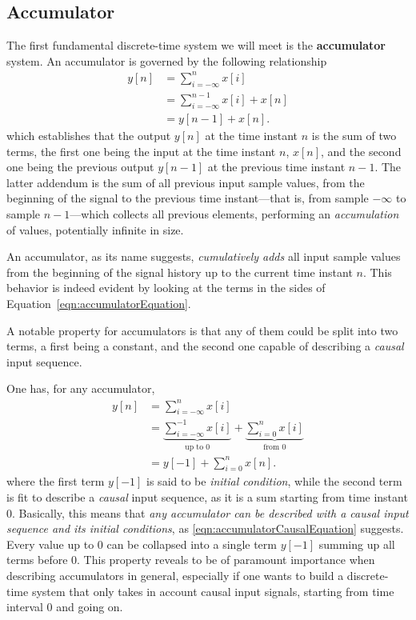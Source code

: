 \documentclass[\documentfontsize, twocolumn]{\classname}
\begin{document}
\subsection{Accumulator}

The first fundamental discrete-time system we will meet is the \textbf{accumulator} system. An accumulator is governed by the following relationship
\begin{align}
    y[n] &= \sum_{i=-\infty}^{n} x[i] \\
         &= \sum_{i=-\infty}^{n-1} x[i] + x[n]\\
         &= y[n-1] + x[n].\label{eqn:accumulatorEquation}
\end{align}
which establishes that the output $y[n]$ at the time instant $n$ is the sum of two terms, the first one being the input at the time instant $n$, $x[n]$, and the second one being the previous output $y[n-1]$ at the previous time instant $n-1$. The latter addendum is the sum of all previous input sample values, from the beginning of the signal to the previous time instant---that is, from sample $-\infty$ to sample $n-1$---which collects all previous elements, performing an \emph{accumulation} of values, potentially infinite in size.

An accumulator, as its name suggests, \emph{cumulatively adds} all input sample values from the beginning of the signal history up to the current time instant $n$. This behavior is indeed evident by looking at the terms in the sides of Equation~\ref{eqn:accumulatorEquation}.

A notable property for accumulators is that any of them could be split into two terms, a first being a constant, and the second one capable of describing a \emph{causal} input sequence.

One has, for any accumulator,
\begin{align}
    y[n] &= \sum_{i=-\infty}^{n} x[i] \\
         &= \underbrace{\sum_{i=-\infty}^{-1} x[i]}_{\mbox{up to } 0} + \underbrace{\sum_{i=0}^{n}x[i]}_{\mbox{from } 0}\\
         &= y[-1] + \sum_{i=0}^n x[n].\label{eqn:accumulatorCausalEquation}
\end{align}
where the first term $y[-1]$ is said to be \emph{initial condition}, while the second term is fit to describe a \emph{causal} input sequence, as it is a sum starting from time instant $0$. Basically, this means that \emph{any accumulator can be described with a causal input sequence and its initial conditions}, as \ref{eqn:accumulatorCausalEquation} suggests. Every value up to $0$ can be collapsed into a single term $y[-1]$ summing up all terms before $0$. This property reveals to be of paramount importance when describing accumulators in general, especially if one wants to build a discrete-time system that only takes in account causal input signals, starting from time interval $0$ and going on.
\end{document}
